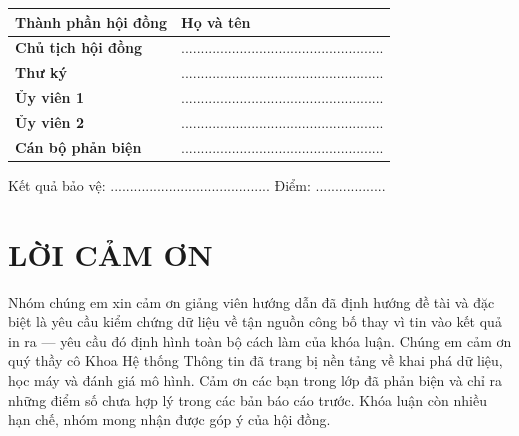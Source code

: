 \documentclass[13pt,a4paper]{extreport}
\begin{document}
\noindent\begin{tabularx}{\textwidth}{|>{\bfseries}p{6.4cm}|X|}
\hline
Thành phần hội đồng & Họ và tên \\
\hline
Chủ tịch hội đồng & .................................................... \\
\hline
Thư ký & .................................................... \\
\hline
Ủy viên 1 & .................................................... \\
\hline
Ủy viên 2 & .................................................... \\
\hline
Cán bộ phản biện & .................................................... \\
\hline
\end{tabularx}
\vspace{0.3cm}

\noindent Kết quả bảo vệ: ......................................... Điểm: ..................
\clearpage

\chapter*{LỜI CẢM ƠN}
Nhóm chúng em xin cảm ơn giảng viên hướng dẫn đã định hướng đề tài và đặc biệt là yêu cầu kiểm
chứng dữ liệu về tận nguồn công bố thay vì tin vào kết quả in ra — yêu cầu đó định hình toàn bộ
cách làm của khóa luận. Chúng em cảm ơn quý thầy cô Khoa Hệ thống Thông tin đã trang bị nền tảng
về khai phá dữ liệu, học máy và đánh giá mô hình. Cảm ơn các bạn trong lớp đã phản biện và chỉ ra
những điểm số chưa hợp lý trong các bản báo cáo trước. Khóa luận còn nhiều hạn chế, nhóm mong nhận
được góp ý của hội đồng.
\clearpage

\tableofcontents
\clearpage

{}
\listoffigures
\clearpage

{}
\listoftables
\clearpage
\end{document}
